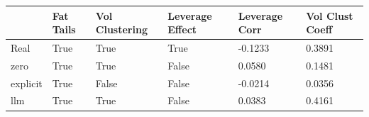\begin{tabular}{llllll}
\toprule
 & Fat Tails & Vol Clustering & Leverage Effect & Leverage Corr & Vol Clust Coeff \\
\midrule
Real & True & True & True & -0.1233 & 0.3891 \\
zero & True & True & False & 0.0580 & 0.1481 \\
explicit & True & False & False & -0.0214 & 0.0356 \\
llm & True & True & False & 0.0383 & 0.4161 \\
\bottomrule
\end{tabular}
